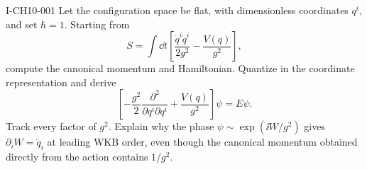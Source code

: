\begin{exercise}{I-CH10-001}
Let the configuration space be flat, with dimensionless coordinates $q^i$, and
set $\hbar=1$.  Starting from
\[
  S=\int\dd t\left[\frac{\dot q^i\dot q^i}{2g^2}
    -\frac{V(q)}{g^2}\right],
\]
compute the canonical momentum and Hamiltonian.  Quantize in the coordinate
representation and derive
\[
  \left[-\frac{g^2}{2}\frac{\partial^2}{\partial q^i\partial q^i}
    +\frac{V(q)}{g^2}\right]\psi=E\psi.
\]
Track every factor of $g^2$.  Explain why the phase
$\psi\sim\exp(\ii W/g^2)$ gives $\partial_iW=\dot q_i$ at leading WKB order,
even though the canonical momentum obtained directly from the action contains
$1/g^2$.
\end{exercise}
